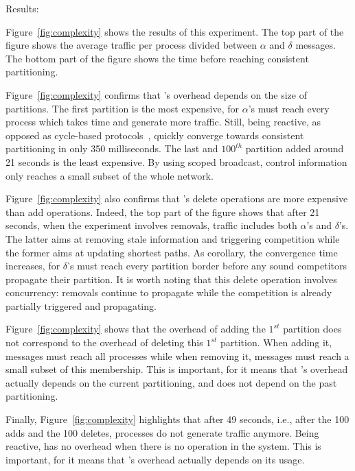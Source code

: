\begin{asparadesc}
\item [Results:]

Figure~\ref{fig:complexity} shows the results of this experiment. The
top part of the figure shows the average traffic per process divided
between $\alpha$ and $\delta$ messages. The bottom part of the figure
shows the time before reaching consistent partitioning.

\noindent Figure~\ref{fig:complexity} confirms that \NAME's overhead
depends on the size of partitions. The first partition is the most
expensive, for $\alpha$'s must reach every process which takes time
and generate more traffic. Still, being reactive, as opposed as
cycle-based protocols~\cite{jelasity2007gossip}, \NAME quickly
converge towards consistent partitioning in only 350 milliseconds. The
last and $100^{th}$ partition added around 21 seconds is the least
expensive. By using scoped broadcast, control information only reaches
a small subset of the whole network.

\noindent Figure~\ref{fig:complexity} also confirms that \NAME's
delete operations are more expensive than add operations. Indeed, the
top part of the figure shows that after 21 seconds, when the
experiment involves removals, traffic includes both $\alpha$'s and
$\delta$'s. The latter aims at removing stale information and
triggering competition while the former aims at updating shortest
paths. As corollary, the convergence time increases, for $\delta$'s
must reach every partition border before any sound competitors
propagate their partition. It is worth noting that this delete
operation involves concurrency: removals continue to propagate while
the competition is already partially triggered and propagating.

\noindent Figure~\ref{fig:complexity} shows that the overhead of
adding the $1^{st}$ partition does not correspond to the overhead of
deleting this $1^{st}$ partition. When adding it, messages must reach
all processes while when removing it, messages must reach a small
subset of this membership. This is important, for it means that
\NAME's overhead actually depends on the current partitioning, and
does not depend on the past partitioning.

\noindent Finally, Figure~\ref{fig:complexity} highlights that after
49 seconds, i.e., after the 100 adds and the 100 deletes, processes do
not generate traffic anymore. Being reactive, \NAME has no overhead
when there is no operation in the system. This is important, for it
means that \NAME's overhead actually depends on its usage.

\end{asparadesc}


